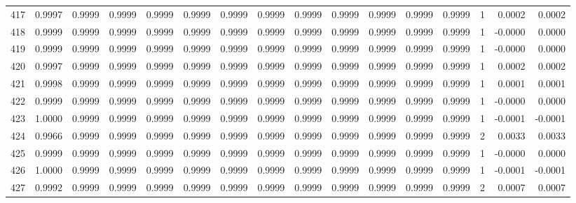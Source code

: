 \begin{tabular}{lrrrrrrrrrrrrrrr}
417 &      0.9997 &  0.9999 &  0.9999 &  0.9999 &  0.9999 &  0.9999 &  0.9999 &  0.9999 &  0.9999 &  0.9999 &   0.9999 &     0.9999 &      1 &                    0.0002 &                     0.0002 \\
418 &      0.9999 &  0.9999 &  0.9999 &  0.9999 &  0.9999 &  0.9999 &  0.9999 &  0.9999 &  0.9999 &  0.9999 &   0.9999 &     0.9999 &      1 &                   -0.0000 &                     0.0000 \\
419 &      0.9999 &  0.9999 &  0.9999 &  0.9999 &  0.9999 &  0.9999 &  0.9999 &  0.9999 &  0.9999 &  0.9999 &   0.9999 &     0.9999 &      1 &                   -0.0000 &                     0.0000 \\
420 &      0.9997 &  0.9999 &  0.9999 &  0.9999 &  0.9999 &  0.9999 &  0.9999 &  0.9999 &  0.9999 &  0.9999 &   0.9999 &     0.9999 &      1 &                    0.0002 &                     0.0002 \\
421 &      0.9998 &  0.9999 &  0.9999 &  0.9999 &  0.9999 &  0.9999 &  0.9999 &  0.9999 &  0.9999 &  0.9999 &   0.9999 &     0.9999 &      1 &                    0.0001 &                     0.0001 \\
422 &      0.9999 &  0.9999 &  0.9999 &  0.9999 &  0.9999 &  0.9999 &  0.9999 &  0.9999 &  0.9999 &  0.9999 &   0.9999 &     0.9999 &      1 &                   -0.0000 &                     0.0000 \\
423 &      1.0000 &  0.9999 &  0.9999 &  0.9999 &  0.9999 &  0.9999 &  0.9999 &  0.9999 &  0.9999 &  0.9999 &   0.9999 &     0.9999 &      1 &                   -0.0001 &                    -0.0001 \\
424 &      0.9966 &  0.9999 &  0.9999 &  0.9999 &  0.9999 &  0.9999 &  0.9999 &  0.9999 &  0.9999 &  0.9999 &   0.9999 &     0.9999 &      2 &                    0.0033 &                     0.0033 \\
425 &      0.9999 &  0.9999 &  0.9999 &  0.9999 &  0.9999 &  0.9999 &  0.9999 &  0.9999 &  0.9999 &  0.9999 &   0.9999 &     0.9999 &      1 &                   -0.0000 &                     0.0000 \\
426 &      1.0000 &  0.9999 &  0.9999 &  0.9999 &  0.9999 &  0.9999 &  0.9999 &  0.9999 &  0.9999 &  0.9999 &   0.9999 &     0.9999 &      1 &                   -0.0001 &                    -0.0001 \\
427 &      0.9992 &  0.9999 &  0.9999 &  0.9999 &  0.9999 &  0.9999 &  0.9999 &  0.9999 &  0.9999 &  0.9999 &   0.9999 &     0.9999 &      2 &                    0.0007 &                     0.0007 \\

\end{tabular}
